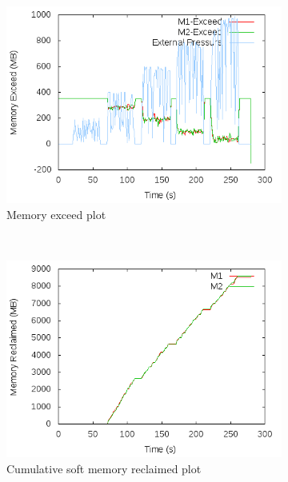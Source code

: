 	  \begin{figure}[t!]
	    \centering
	    \begin{subfigure}[t]{0.48\textwidth}
	      \centering
	      \includegraphics[width=1\textwidth]{images/controller_issues/exceed_only/Exceed.png}
	      \caption{Memory exceed plot}
	      \label{img_exceed_only_1_exceed}
	    \end{subfigure}
	    ~ 
	    \begin{subfigure}[t]{0.48\textwidth}
	      \centering
	      \includegraphics[width=1\textwidth]{images/controller_issues/exceed_only/Memory_Reclaimed.png}
	      \caption{Cumulative soft memory reclaimed plot}
	      \label{img_exceed_only_1_smr}
	    \end{subfigure}
	    ~ 
	    \begin{subfigure}[t]{0.48\textwidth}

\end{subfigure}
\end{figure}
